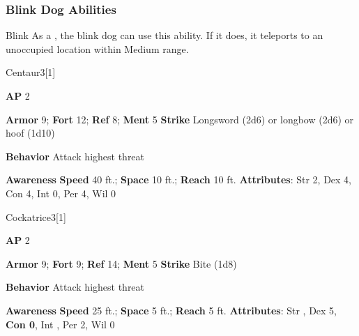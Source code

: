 \subsubsection{Blink Dog Abilities}

\begin{ability}{Blink}
As a , the blink dog can use this ability.
If it does, it teleports to an unoccupied location within Medium range.
\end{ability}

\begin{monsection}{Centaur}{3}[1]
\vspace{-1em}\vspace{-1em}
\begin{spellcontent}
\begin{spelltargetinginfo}
{\textbf{AP} 2}

\pari \textbf{Armor} 9;
\textbf{Fort} 12;
\textbf{Ref} 8;
\textbf{Ment} 5
\pari \textbf{Strike} Longsword  (2d6) or longbow  (2d6) or hoof  (1d10)



\pari \textbf{Behavior} Attack highest threat
\end{spelltargetinginfo}
\end{spellcontent}

\begin{monsterfooter}
\pari \textbf{Awareness} 
\pari \textbf{Speed} 40 ft.;
\textbf{Space} 10 ft.;
\textbf{Reach} 10 ft.
\pari \textbf{Attributes}:
Str 2,
Dex 4,
Con 4,
Int 0,
Per 4,
Wil 0
\end{monsterfooter}
\end{monsection}

\begin{monsection}{Cockatrice}{3}[1]
\vspace{-1em}\vspace{-1em}
\begin{spellcontent}
\begin{spelltargetinginfo}
{\textbf{AP} 2}

\pari \textbf{Armor} 9;
\textbf{Fort} 9;
\textbf{Ref} 14;
\textbf{Ment} 5
\pari \textbf{Strike} Bite  (1d8)



\pari \textbf{Behavior} Attack highest threat
\end{spelltargetinginfo}
\end{spellcontent}

\begin{monsterfooter}
\pari \textbf{Awareness} 
\pari \textbf{Speed} 25 ft.;
\textbf{Space} 5 ft.;
\textbf{Reach} 5 ft.
\pari \textbf{Attributes}:
Str ,
Dex 5,
\textbf{Con 0},
Int ,
Per 2,
Wil 0
\end{monsterfooter}
\end{monsection}


